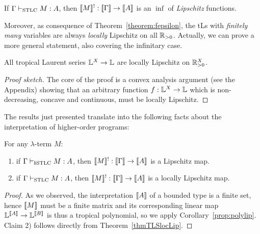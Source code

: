 \begin{corollary}\label{thm:M=infLip}
 If $\Gamma \vdash_{\mathrm{STLC}}M:A$, then $\llbracket M\rrbracket^!: \llbracket\Gamma\rrbracket \to \llbracket A\rrbracket$ is an $\inf$ of \emph{Lipschitz} functions.
\end{corollary}
 
% 
%

 
Moreover, as consequence of Theorem~\ref{theorem:fepsilon}, the tLs with \emph{finitely many} variables are always \emph{locally} Lipschitz on all $\mathbb{R}_{>0}$.
Actually, we can prove a more general statement, also covering the infinitary case.


\begin{theorem}\label{thmTLSlocLip}
 All tropical Laurent series $\mathbb{L}^X\to\mathbb{L}$ are locally Lipschitz on $\mathbb{R}_{>0}^X$.
\end{theorem}
\begin{proof}[Proof sketch]
The core of the proof is a convex analysis argument (see the Appendix) showing that an arbitrary function $f:\mathbb{L}^X\to\mathbb{L}$ which is non-decreasing, concave and continuous, must be locally Lipschitz. 
\end{proof}


The results just presented translate into the following facts about the interpretation of higher-order programs:
\begin{corollary}
For any $\lambda$-term $M$:
\begin{enumerate}
\item if $\Gamma \vdash_{\BSTLC} M:A$, then $\llbracket M\rrbracket^!:\llbracket\Gamma\rrbracket \to \llbracket A\rrbracket$ is a Lipschitz map.
\item if $\Gamma \vdash_{\mathrm{STLC}}M:A$, then $\llbracket M\rrbracket^!: \llbracket\Gamma\rrbracket \to \llbracket A\rrbracket$ is a locally Lipschitz map.
\end{enumerate}
\end{corollary} 
\begin{proof}
As we observed, the interpretation $\llbracket A\rrbracket$ of a bounded type is a finite set, hence $\llbracket M\rrbracket$ must be a finite matrix  and  its corresponding linear map $\mathbb{L}^{\llbracket A\rrbracket} \to \mathbb{L}^{\llbracket B\rrbracket}$ is thus a tropical polynomial, so we apply Corollary~\ref{prop:polylip}.
Claim 2) follows directly from Theorem~\ref{thmTLSlocLip}.
\end{proof}


